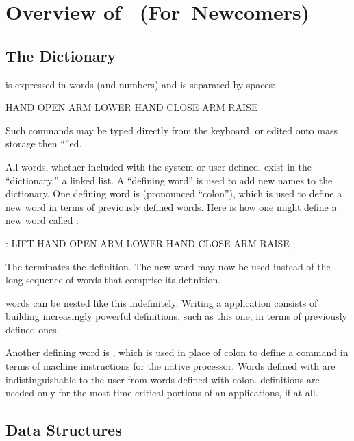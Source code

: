 \appendix{}
\chapter{Overview of~\Forth{} (For~Newcomers)}

\section{The Dictionary}%
%
%

\expandafter\initialb\Forth{} is expressed in words (and numbers) and is separated by spaces:
\begin{Code}
HAND OPEN  ARM LOWER  HAND CLOSE  ARM RAISE 
\end{Code}
Such commands may be typed directly from the keyboard, or edited onto 
mass storage then ``''ed.

All words, whether included with the system or user-defined, exist in the
``dictionary,'' a linked list.  A ``defining word'' is used to add new
names to the dictionary.  One defining word is \forthb{:} (pronounced
``colon''), which is used to define a new word in terms of previously
defined words.  Here is how one might define a new word called :
\begin{Code}
: LIFT   HAND OPEN  ARM LOWER  HAND CLOSE  ARM RAISE ;
\end{Code}
The \forthb{;} terminates the definition.  The new word  may
now be used instead of the long sequence of words that comprise its
definition.

\Forth{} words can be nested like this indefinitely.  Writing a 
\Forth{} application consists of building increasingly powerful definitions,
such as this one, in terms of previously defined ones.

Another defining word is ,
which is used in place of colon to define a command in terms of machine
instructions for the native processor.  Words defined with 
are indistinguishable to the user from words defined with colon.
 definitions are needed only for the most time-critical
portions of an applications, if at all.

\section{Data Structures}%
%

